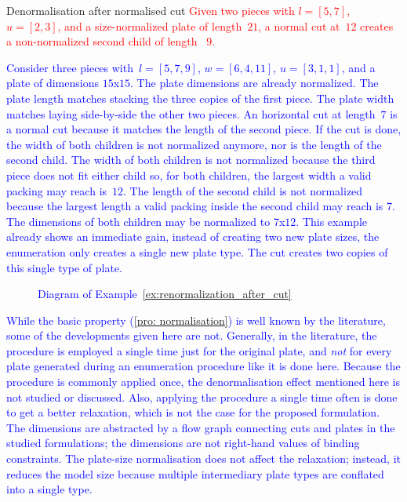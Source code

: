 \documentclass[ppgc,tese,english,formais,babel]{iiufrgs}
\newif\iffinalversion
\newcommand{\newtext}[1]{\iffinalversion%
#1%
\else%
\textcolor{blue}{#1}%
\fi%
}
\newcommand{\oldtext}[1]{\iffinalversion%
\else%
\textcolor{red}{#1}%
\fi%
}
\begin{document}
\begin{example}{Denormalisation after normalised cut}\label{ex:renormalization_after_cut}
\oldtext{Given two pieces with \(l = [5, 7]\), \(u = [2, 3]\), and a size-normalized plate of length~\(21\), a normal cut at~\(12\) creates a non-normalized second child of length~ \(9\).}
\newtext{Consider three pieces with~\(l = [5, 7, 9]\), \(w = [6, 4, 11]\), \(u = [3, 1, 1]\), and a plate of dimensions \(15\)x\(15\). The plate dimensions are already normalized. The plate length matches stacking the three copies of the first piece. The plate width matches laying side-by-side the other two pieces. An horizontal cut at length~\(7\) is a normal cut because it matches the length of the second piece. If the cut is done, the width of both children is not normalized anymore, nor is the length of the second child. The width of both children is not normalized because the third piece does not fit either child so, for both children, the largest width a valid packing may reach is~\(12\). The length of the second child is not normalized because the largest length a valid packing inside the second child may reach is 7. The dimensions of both children may be normalized to \(7\)x\(12\). This example already shows an immediate gain, instead of creating two new plate sizes, the enumeration only creates a single new plate type. The cut creates two copies of this single type of plate.}
\end{example}

\begin{figure}[h]
  \caption{\newtext{Diagram of Example~\ref{ex:renormalization_after_cut}}}
  \center
  
  \legend{\newtext{Notes about the diagrams: (a) the three copies of the first piece stacked; (b) the second and third pieces side-by-side; (c) both children of a horizontal normal cut over a normalized plate are not normalized themselves.}}
  \label{fig:renormalization_after_cut}
\end{figure}

\newtext{
While the basic property (\cref{pro: normalisation}) is well known by the literature, some of the developments given here are not.
Generally, in the literature, the procedure is employed a single time just for the original plate, and \emph{not} for every plate generated during an enumeration procedure like it is done here.
Because the procedure is commonly applied once, the denormalisation effect mentioned here is not studied or discussed.
Also, applying the procedure a single time often is done to get a better relaxation, which is not the case for the proposed formulation.
The dimensions are abstracted by a flow graph connecting cuts and plates in the studied formulations; the dimensions are not right-hand values of binding constraints.
The plate-size normalisation does not affect the relaxation; instead, it reduces the model size because multiple intermediary plate types are conflated into a single type.
}
\end{document}
